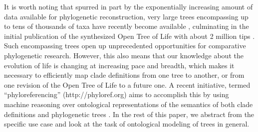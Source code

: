 It is worth noting that spurred in part by the exponentially
increasing amount of data available for phylogenetic reconstruction,
very large trees encompassing up to tens of thousands of taxa have
recently become available \cite{Goloboff2009-oa,Driskell2004-wq,Dunn2008-tr,Smith2009-yk,Jarvis2014-lq}, culminating in the initial publication of
the synthesized Open Tree of Life with about 2 million tips \cite{Hinchliff2015-nd}. Such
encompassing trees open up unprecedented opportunities for comparative
phylogenetic research. However, this also means that our knowledge
about the evolution of life is changing at increasing pace and
breadth, which makes it necessary to efficiently map clade definitions
from one tree to another, or from one revision of the Open Tree of
Life to a future one. A recent initiative, termed ``phyloreferencing''
(http://phyloref.org) aims to accomplish this by using machine
reasoning over ontological representations of the semantics of both
clade definitions and phylogenetic trees \cite{Cellinese2015-zv,Michael_Keesey2007-lb,Sereno2005-wv}. In the rest of this paper, we abstract from the specific use case and look at the task of ontological modeling of trees in general.
